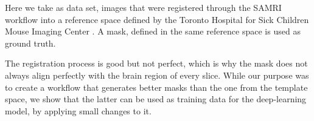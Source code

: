 Here we take as data set, images that were registered through the SAMRI workflow into a reference space defined by the Toronto Hospital for Sick Children Mouse Imaging Center \cite{dsu}.
A mask, defined in the same reference space is used as ground truth.

The registration process is good but not perfect, which is why the mask does not always align perfectly with the brain region of every slice.
While our purpose was to create a workflow that generates better masks than the one from the template space, we show that the latter can be used as training data for the deep-learning model, by applying small changes to it.